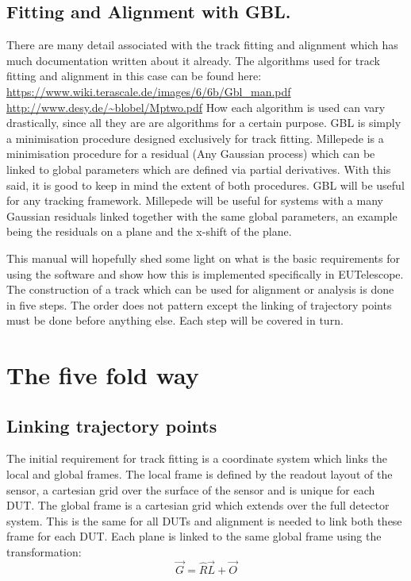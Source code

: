 \subsection{Fitting and Alignment with GBL.}
There are many detail associated with the track fitting and alignment which has much documentation written about it already. The algorithms used for track fitting and alignment in this case can be found here:
\newline	
\url{https://www.wiki.terascale.de/images/6/6b/Gbl_man.pdf}
\newline
\url{http://www.desy.de/~blobel/Mptwo.pdf}
\newline
How each algorithm is used can vary drastically, since all they are are algorithms for a certain purpose. GBL is simply a minimisation procedure designed exclusively for track fitting. Millepede is a minimisation procedure for a residual (Any Gaussian process) which can be linked to global parameters which are defined via partial derivatives. With this said, it is good to keep in mind the extent of both procedures. GBL will be useful for any tracking framework. Millepede will be useful for systems with a many Gaussian residuals linked together with the same global parameters, an example being the residuals on a plane and the x-shift of the plane.


This manual will hopefully shed some light on what is the basic requirements for using the software and show how this is implemented specifically in EUTelescope. The construction of a track which can be used for alignment or analysis is done in five steps. The order does not pattern except the linking of trajectory points must be done before anything else. Each step will be covered in turn. 
\section{The five fold way}
\subsection{Linking trajectory points}
The initial requirement for track fitting is a coordinate system which links the local and global frames. The local frame is defined by the readout layout of the sensor, a cartesian grid over the surface of the sensor and is unique for each DUT. The global frame is a cartesian grid which extends over the full detector system. This is the same for all DUTs and alignment is needed to link both these frame for each DUT. Each plane is linked to the same global frame using the transformation:
\begin{equation}
 \overrightarrow{G} =   \hat{R}\overrightarrow{L} +  \overrightarrow{O}
\end{equation}

